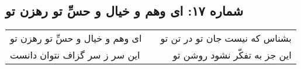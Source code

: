 \begin{center}
\section*{شماره ۱۷: ای وهم و خیال و حسِّ تو رهزن تو}
\label{sec:017}
\begin{longtable}{l p{0.5cm} r}
ای وهم و خیال و حسِّ تو رهزن تو
&&
بشناس که نیست جان تو در تن تو
\\
این سر ز سر گزاف نتوان دانست
&&
این جز به تفکّر نشود روشن تو
\\
\end{longtable}
\end{center}
